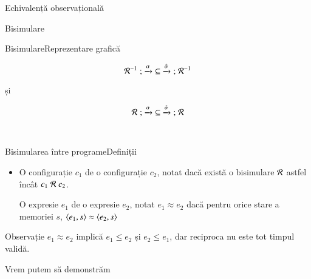 \documentclass[xcolor=pdftex,romanian,colorlinks]{beamer}
\begin{document}
\begin{section}{Echivalență observațională}
\begin{subsection}{Bisimulare}
\begin{frame}{Bisimulare}{Reprezentare grafică}
\begin{minipage}{.3\columnwidth}
\[{\cal R}^{-1} \mathrel{;} {\xrightarrow{{\alpha}}} \subseteq   {\xrightarrow{\hat{\alpha}}}  \mathrel{;} {\cal R}^{-1}\]
\end{minipage}
\hfill\mbox{\LARGE și }
\hfill \begin{minipage}{.3\columnwidth}

\[{\cal R} \mathrel{;} {\xrightarrow{{\alpha}}} \subseteq   {\xrightarrow{\hat{\alpha}}}  \mathrel{;} {\cal R}\]
\end{minipage}
\hfill\ 

\end{frame}

\begin{frame}{Bisimularea între programe}{Definiții}
\begin{itemize}
\item O configurație $c_1$  de o configurație $c_2$, notat  dacă există o bisimulare $\cal R$ astfel încât $c_1 \mathrel{\cal R} c_2$.

\vitem O expresie $e_1$  de o expresie $e_2$, notat $e_1 \approx e_2$ dacă pentru orice stare a memoriei $s$,  ${\langle{e_1,s}\rangle}\approx {\ensuremath \langle{e_2,s}\rangle}$
\end{itemize}

\vfill
\begin{alertblock}{Observație}
$e_1 \approx e_2$ implică $e_1 \leq e_2$ și $e_2 \leq e_1$, dar reciproca nu este tot timpul validă.
\end{alertblock}
\end{frame}




\begin{frame}[fragile]{Vrem putem să demonstrăm}
\hfill\begin{minipage}{.25\columnwidth}
\begin{asciiml}



\end{asciiml}
\end{minipage}
\end{frame}
\end{subsection}
\end{section}
\end{document}
